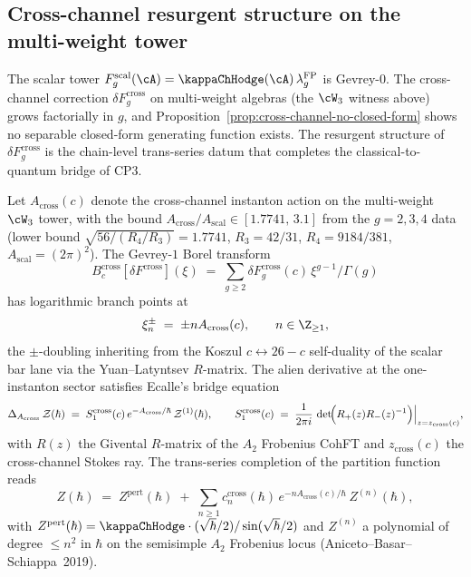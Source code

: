 \subsection{Cross-channel resurgent structure on the multi-weight tower}
\label{subsec:cross-channel-resurgence}

The scalar tower $F_g^{\mathrm{scal}}(\cA) = \kappaChHodge(\cA)\,\lambda_g^{\mathrm{FP}}$
is Gevrey-$0$. The cross-channel correction
$\delta F_g^{\mathrm{cross}}$ on multi-weight algebras (the $\cW_3$
witness above) grows factorially in $g$, and Proposition~\ref{prop:cross-channel-no-closed-form}
shows no separable closed-form generating function exists. The
resurgent structure of $\delta F_g^{\mathrm{cross}}$ is the chain-level
trans-series datum that completes the
classical-to-quantum bridge of CP3.

\begin{theorem}
\label{thm:cross-channel-resurgent-structure}
Let $A_{\mathrm{cross}}(c)$ denote the cross-channel instanton action
on the multi-weight $\cW_3$ tower, with the bound
$A_{\mathrm{cross}} / A_{\mathrm{scal}} \in [1.7741,\, 3.1]$ from the
$g = 2, 3, 4$ data \textup{(}lower bound $\sqrt{56/(R_4/R_3)} = 1.7741$,
$R_3 = 42/31$, $R_4 = 9184/381$, $A_{\mathrm{scal}} = (2\pi)^2$\textup{)}.
The Gevrey-$1$ Borel transform
\[
 B^{\mathrm{cross}}_c[\delta F^{\mathrm{cross}}](\xi)
 \;=\;
 \sum_{g \ge 2} \delta F_g^{\mathrm{cross}}(c)\, \xi^{g - 1}/\Gamma(g)
\]
has logarithmic branch points at
\[
 \xi_n^{\pm} \;=\; \pm n A_{\mathrm{cross}}(c),
\qquad n \in \Z_{\ge 1},
\]
the $\pm$-doubling inheriting from the Koszul $c \leftrightarrow 26 - c$
self-duality of the scalar bar lane via the Yuan--Latyntsev
$R$-matrix. The alien derivative at the one-instanton sector
satisfies Ecalle's bridge equation
\[
 \Delta_{A_{\mathrm{cross}}}\,\mathcal Z(\hbar)
 \;=\;
 S_1^{\mathrm{cross}}(c)\,
 e^{-A_{\mathrm{cross}}/\hbar}\,
 \mathcal Z^{(1)}(\hbar),
\qquad
 S_1^{\mathrm{cross}}(c)
 \;=\;
 \frac{1}{2 \pi i}\,
 \det\!\Bigl( R_+(z) R_-(z)^{-1} \Bigr)\Big|_{z = z_{\mathrm{cross}}(c)},
\]
with $R(z)$ the Givental $R$-matrix of the $A_2$ Frobenius CohFT
and $z_{\mathrm{cross}}(c)$ the cross-channel Stokes ray. The
trans-series completion of the partition function reads
\[
 Z(\hbar)
 \;=\;
 Z^{\mathrm{pert}}(\hbar)
 \;+\;
 \sum_{n \ge 1}
  c_n^{\mathrm{cross}}(\hbar)\,
  e^{-n A_{\mathrm{cross}}(c)/\hbar}\,
  Z^{(n)}(\hbar),
\]
with $Z^{\mathrm{pert}}(\hbar) = \kappaChHodge \cdot
(\sqrt\hbar/2)/\sin(\sqrt\hbar/2)$ and $Z^{(n)}$ a polynomial of degree
$\le n^2$ in $\hbar$ on the semisimple $A_2$ Frobenius locus
\textup{(}Aniceto--Basar--Schiappa~2019\textup{)}.
\end{theorem}

